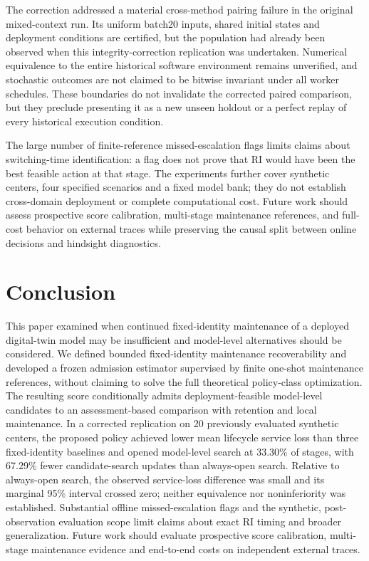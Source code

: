 \documentclass[journal]{IEEEtran}
\begin{document}
The correction addressed a material cross-method pairing failure in
the original mixed-context run. Its uniform batch20 inputs, shared
initial states and deployment conditions are certified, but the
population had already been observed when this integrity-correction
replication was undertaken. Numerical equivalence to the entire
historical software environment remains unverified, and stochastic
outcomes are not claimed to be bitwise invariant under all worker
schedules. These boundaries do not invalidate the corrected paired
comparison, but they preclude presenting it as a new unseen holdout
or a perfect replay of every historical execution condition.

The large number of finite-reference missed-escalation flags limits
claims about switching-time identification: a flag does not prove
that RI would have been the best feasible action at that stage.
The experiments further cover synthetic centers, four specified
scenarios and a fixed model bank; they do not establish cross-domain
deployment or complete computational cost. Future work should assess
prospective score calibration, multi-stage maintenance references,
and full-cost behavior on external traces while preserving the
causal split between online decisions and hindsight diagnostics.
\section{Conclusion}
This paper examined when continued fixed-identity maintenance of a
deployed digital-twin model may be insufficient and model-level
alternatives should be considered. We defined bounded fixed-identity
maintenance recoverability and developed a frozen admission estimator
supervised by finite one-shot maintenance references, without claiming
to solve the full theoretical policy-class optimization. The resulting
score conditionally admits deployment-feasible model-level candidates
to an assessment-based comparison with retention and local maintenance.
In a corrected replication on 20 previously evaluated synthetic
centers, the proposed policy achieved lower mean lifecycle service
loss than three fixed-identity baselines and opened model-level search
at 33.30\% of stages, with 67.29\% fewer candidate-search updates than
always-open search. Relative to always-open search, the observed
service-loss difference was small and its marginal 95\% interval
crossed zero; neither equivalence nor noninferiority was established.
Substantial offline missed-escalation flags and the synthetic,
post-observation evaluation scope limit claims about exact RI timing
and broader generalization. Future work should evaluate prospective
score calibration, multi-stage maintenance evidence and end-to-end
costs on independent external traces.

\end{document}
